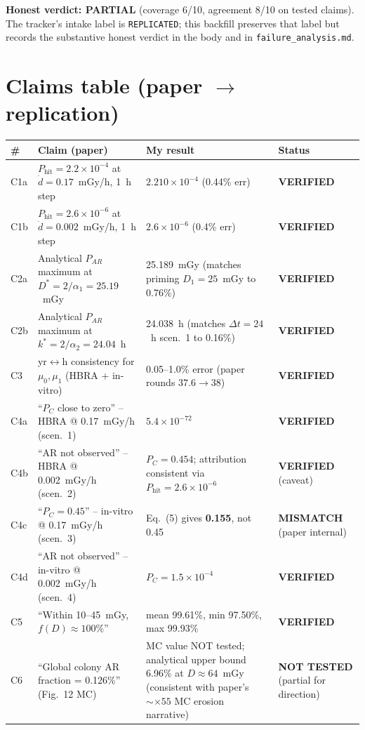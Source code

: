 \documentclass[11pt]{article}
\begin{document}
\textbf{Honest verdict: PARTIAL} (coverage 6/10, agreement 8/10 on tested claims).
The tracker's intake label is \texttt{REPLICATED}; this backfill preserves that label but
records the substantive honest verdict in the body and in
\texttt{failure\_analysis.md}.

\section{Claims table (paper $\to$ replication)}
\begin{longtable}{@{}p{}p{}p{}p{}@{}}
\toprule
\# & Claim (paper) & My result & Status \\
\midrule
\endhead
C1a & $P_{\text{hit}}=2.2\times 10^{-4}$ at $\dot{d}=0.17$~mGy/h, 1~h step & $2.210\times 10^{-4}$ (0.44\% err) & \textbf{VERIFIED} \\
C1b & $P_{\text{hit}}=2.6\times 10^{-6}$ at $\dot{d}=0.002$~mGy/h, 1~h step & $2.6\times 10^{-6}$ (0.4\% err) & \textbf{VERIFIED} \\
C2a & Analytical $P_{AR}$ maximum at $D^{*}=2/\alpha_1=25.19$~mGy & 25.189~mGy (matches priming $D_1=25$~mGy to 0.76\%) & \textbf{VERIFIED} \\
C2b & Analytical $P_{AR}$ maximum at $k^{*}=2/\alpha_2=24.04$~h & 24.038~h (matches $\Delta t=24$~h scen.~1 to 0.16\%) & \textbf{VERIFIED} \\
C3  & yr$\leftrightarrow$h consistency for $\mu_0,\mu_1$ (HBRA + in-vitro) & 0.05--1.0\% error (paper rounds $37.6\to38$) & \textbf{VERIFIED} \\
C4a & ``$P_C$ close to zero'' -- HBRA @ 0.17~mGy/h (scen.~1) & $5.4\times 10^{-72}$ & \textbf{VERIFIED} \\
C4b & ``AR not observed'' -- HBRA @ 0.002~mGy/h (scen.~2) & $P_C=0.454$; attribution consistent via $P_{\text{hit}}=2.6\times 10^{-6}$ & \textbf{VERIFIED} (caveat) \\
C4c & ``$P_C=0.45$'' -- in-vitro @ 0.17~mGy/h (scen.~3) & Eq.~(5) gives \textbf{0.155}, not 0.45 & \textbf{MISMATCH} (paper internal) \\
C4d & ``AR not observed'' -- in-vitro @ 0.002~mGy/h (scen.~4) & $P_C=1.5\times 10^{-4}$ & \textbf{VERIFIED} \\
C5  & ``Within 10--45~mGy, $f(D)\approx 100\%$'' & mean 99.61\%, min 97.50\%, max 99.93\% & \textbf{VERIFIED} \\
C6  & ``Global colony AR fraction = 0.126\%'' (Fig.~12 MC) & MC value NOT tested; analytical upper bound 6.96\% at $D\approx64$~mGy (consistent with paper's $\sim\times55$ MC erosion narrative) & \textbf{NOT TESTED} (partial for direction) \\

\end{longtable}
\end{document}
